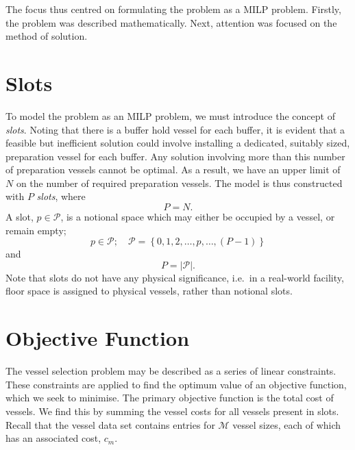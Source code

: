 The focus thus centred on formulating the problem as a MILP problem.
Firstly, the problem was described mathematically.
Next, attention was focused on the method of solution.

\section{Slots}\label{S.slots}

To model the problem as an MILP problem, we must introduce the concept of
\emph{slots}.
Noting that there is a buffer hold vessel for each buffer, it is evident that
a feasible but inefficient solution could involve installing a dedicated,
suitably sized, preparation vessel for each buffer.
Any solution involving more than this number of preparation vessels cannot
be optimal.
As a result, we have an upper limit of $N$ on the number of required
preparation vessels.
The model is thus constructed with $P$ \emph{slots}, where
\begin{equation}
    P = N.
\end{equation}
A slot, $p \in \mathcal{P}$, is a notional space which may either be occupied
by a vessel, or remain empty;
\begin{equation}
    p \in \mathcal{P}; \quad \mathcal{P} = \left\{ 0, 1, 2, \ldots, p, \ldots,
    \left( P - 1 \right) \right\}
\end{equation}
and
\begin{equation}
    P = |\mathcal{P}|.
\end{equation}
Note that slots do not have any physical significance, i.e.\ in a real-world
facility, floor space is assigned to physical vessels, rather than notional
slots.

\section{Objective Function}\label{S.objfn}

The vessel selection problem may be described as a series of linear
constraints.
These constraints are applied to find the optimum value of an objective
function, which we seek to minimise.
The primary objective function is the total cost of vessels.
We find this by summing the vessel costs for all vessels present in slots.
Recall that the vessel data set contains entries for $\mathcal{M}$ vessel
sizes, each of which has an associated cost, $c_{m}$.

